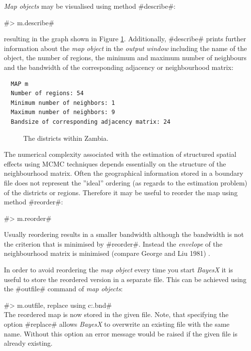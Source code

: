 \documentclass{article}
\begin{document}
{\it Map objects} may be visualised using method #describe#:

#> m.describe#

resulting in the graph shown in Figure \ref{zambiamap}.
Additionally, #describe# prints further information about the {\it
map object} in the {\it output window} including the name of the
object, the number of regions, the minimum and maximum number of
neighbours and the bandwidth of the corresponding adjacency or
neighbourhood matrix:

\begin{verbatim}
  MAP m
  Number of regions: 54
  Minimum number of neighbors: 1
  Maximum number of neighbors: 9
  Bandsize of corresponding adjacency matrix: 24
\end{verbatim}

\begin{figure}[ht]
\begin{center}
 {\it\caption{The
districts within Zambia.\label{zambiamap}}}
\end{center}
\end{figure}


The numerical complexity associated with the estimation of
structured spatial effects using MCMC techniques depends
essentially on the structure of the neighbourhood matrix. Often
the geographical information stored in a boundary file does not
represent the ''ideal'' ordering (as regards to the estimation
problem) of the districts or regions. Therefore it may be useful
to reorder the map using method #reorder#:

#> m.reorder#

Usually reordering results in a smaller bandwidth although the
bandwidth is not the criterion that is minimised by #reorder#.
Instead the {\it envelope} of the neighbourhood matrix is
minimised (compare George and Liu 1981) \nocite{geoliu81}.

In order to avoid reordering the {\it map object} every time you
start {\it BayesX} it is useful to store the reordered version in
a separate file. This can be achieved using the #outfile# command
of {\it map objects}:

#> m.outfile, replace using c:\data\zambiasort.bnd#\\

The reordered map is now stored in the given file. Note, that
specifying the option #replace# allows {\it BayesX} to overwrite
an existing file with the same name. Without this option an error
message would be raised if the given file is already existing.
\end{document}
